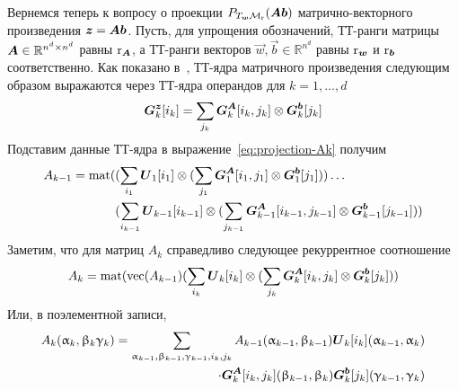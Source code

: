 Вернемся теперь к вопросу о проекции $P_{T_{\boldsymbol{w}} \mathcal{M}_{\operatorname{r}}} (\boldsymbol{A}\boldsymbol{b})$ матрично-векторного произведения $\boldsymbol{z} = \boldsymbol{A}\boldsymbol{b}$. Пусть, для упрощения обозначений, ТТ-ранги матрицы $\boldsymbol{A} \in \mathbb{R}^{n^d \times n^d}$  равны $\operatorname{r}_{\boldsymbol{A}}$, а ТТ-ранги векторов $\vec{w}, \vec{b} \in \mathbb{R}^{n^d}$ равны $\operatorname{r}_{\boldsymbol{w}}$ и $\operatorname{r}_{\boldsymbol{b}}$ соответственно. Как показано в~\cite{oseledets2011ttMain}, ТТ-ядра матричного произведения следующим образом выражаются через ТТ-ядра операндов для $k = 1, \ldots, d$
\[
\boldsymbol{G}_k^{\boldsymbol{z}}[i_k] = \sum_{j_k} \boldsymbol{G}_k^{\boldsymbol{A}}[i_k, j_k] \otimes \boldsymbol{G}_k^{\boldsymbol{b}}[j_k]
\]
Подставим данные ТТ-ядра в выражение~\eqref{eq:projection-Ak} получим
\begin{equation*}
\begin{aligned}
A_{k-1} = \text{mat}(&(\sum_{i_1}\boldsymbol{U}_1[i_1] \otimes (\sum_{j_1}\boldsymbol{G}_1^{\boldsymbol{A}}[i_1, j_1] \otimes \boldsymbol{G}_1^{\boldsymbol{b}}[j_1])) \ldots \\
& (\sum_{i_{k-1}}\boldsymbol{U}_{k-1}[i_{k-1}] \otimes (\sum_{j_{k-1}}\boldsymbol{G}_{k-1}^{\boldsymbol{A}}[i_{k-1}, j_{k-1}] \otimes \boldsymbol{G}_{k-1}^{\boldsymbol{b}}[j_{k-1}]))
\end{aligned}
\end{equation*}
Заметим, что для матриц $A_k$ справедливо следующее рекуррентное соотношение
\begin{equation*}
\begin{aligned}
A_{k} = \text{mat}(\text{vec}(A_{k-1}) (\sum_{i_{k}}\boldsymbol{U}_{k}[i_{k}] \otimes (\sum_{j_k}\boldsymbol{G}_k^{\boldsymbol{A}}[i_{k}, j_{k}] \otimes \boldsymbol{G}_{k}^{\boldsymbol{b}}[j_{k}]))
\end{aligned}
\end{equation*}
Или, в поэлементной записи,
\begin{equation}
\begin{aligned}
\label{eq:projection-matvec-elemnwise}
A_{k}(\upalpha_k, \upbeta_k \upgamma_k) = \sum_{\upalpha_{k-1}, \upbeta_{k-1}, \upgamma_{k-1}, i_k, j_k} A_{k-1}(\upalpha_{k-1}, \upbeta_{k-1}) \boldsymbol{U}_{k}[i_{k}](\upalpha_{k-1}, \upalpha_{k}) \\
\cdot \boldsymbol{G}_k^{\boldsymbol{A}}[i_{k}, j_{k}](\upbeta_{k-1}, \upbeta_{k})  \boldsymbol{G}_{k}^{\boldsymbol{b}}[j_{k}](\upgamma_{k-1}, \upgamma_{k})
\end{aligned}
\end{equation}
